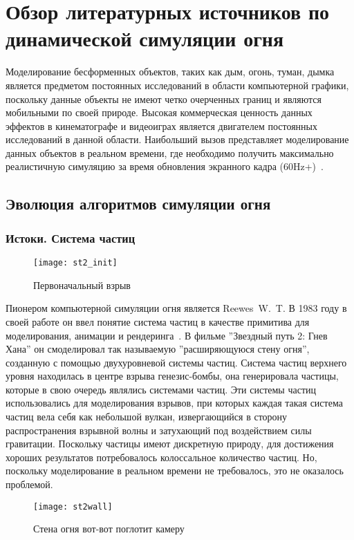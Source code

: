 \chapter{Обзор литературных источников по динамической симуляции огня}

Моделирование бесформенных объектов, таких как дым, огонь, туман, дымка является
предметом постоянных исследований в области компьютерной графики, поскольку
данные объекты не имеют четко очерченных границ и являются мобильными по своей
природе. Высокая коммерческая ценность данных эффектов в кинематографе и
видеоиграх является двигателем постоянных исследований в данной области.
Наибольший вызов представляет моделирование данных объектов в реальном времени,
где необходимо получить максимально реалистичную симуляцию за время обновления
экранного кадра (60Hz+)~\cite{lec17}.

\section{Эволюция алгоритмов симуляции огня}
\subsection{Истоки. Система частиц}
\begin{figure}[htb]
	\centering
	\texttt{[image: st2\_init]}
	\caption{Первоначальный взрыв}
\end{figure}
Пионером компьютерной симуляции огня является Reewes~W.~T. В 1983 году в своей
работе он ввел понятие система частиц в качестве примитива для моделирования,
анимации и рендеринга~\cite{reewes1983}. В фильме ''Звездный путь 2: Гнев Хана''
он смоделировал так называемую ''расширяющуюся стену огня'', созданную с помощью
двухуровневой системы частиц. Система частиц верхнего уровня находилась в центре
взрыва генезис-бомбы, она генерировала частицы, которые в свою очередь являлись
системами частиц. Эти системы частиц использовались для моделирования взрывов,
при которых каждая такая система частиц вела себя как небольшой вулкан,
извергающийся в сторону распространения взрывной волны и затухающий под
воздействием силы гравитации. Поскольку частицы имеют дискретную природу, для
достижения хороших результатов потребовалось колоссальное количество частиц. Но,
поскольку моделирование в реальном времени не требовалось, это не оказалось
проблемой.
\begin{figure}[htb]
	\centering
	\texttt{[image: st2wall]}
	\caption{Стена огня вот-вот поглотит камеру}
\end{figure}

